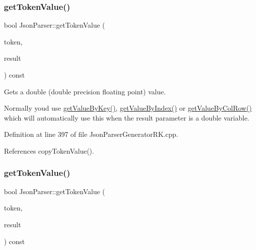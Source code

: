 \mbox{\label{class_json_parser_af378b1400c3f091ae6ba67dc588ca863}} 
\subsubsection{\texorpdfstring{get\+Token\+Value()}{getTokenValue()}\hspace{0.1cm}{\footnotesize\ttfamily [5/8]}}
{\footnotesize\ttfamily bool Json\+Parser\+::get\+Token\+Value (\begin{DoxyParamCaption}\item[{const \hyperlink{struct_json_parser_generator_r_k_1_1jsmntok__t}{Json\+Parser\+Generator\+R\+K\+::jsmntok\+\_\+t} $\ast$}]{token,  }\item[{double \&}]{result }\end{DoxyParamCaption}) const}



Gets a double (double precision floating point) value. 

Normally you\textquotesingle{}d use \hyperlink{class_json_parser_a13abcdcb2341f65ac358bb4d81007d06}{get\+Value\+By\+Key()}, \hyperlink{class_json_parser_a53bd8a6ebb0d9b246b876653e792368f}{get\+Value\+By\+Index()} or \hyperlink{class_json_parser_af1f4a3a65b5cc9cd19b129c410aa78e0}{get\+Value\+By\+Col\+Row()} which will automatically use this when the result parameter is a double variable. 

Definition at line 397 of file Json\+Parser\+Generator\+R\+K.\+cpp.



References copy\+Token\+Value().

\mbox{\label{class_json_parser_a44cff567586e80ba63d39324e5929672}} 
\subsubsection{\texorpdfstring{get\+Token\+Value()}{getTokenValue()}\hspace{0.1cm}{\footnotesize\ttfamily [6/8]}}
{\footnotesize\ttfamily bool Json\+Parser\+::get\+Token\+Value (\begin{DoxyParamCaption}\item[{const \hyperlink{struct_json_parser_generator_r_k_1_1jsmntok__t}{Json\+Parser\+Generator\+R\+K\+::jsmntok\+\_\+t} $\ast$}]{token,  }\item[{\hyperlink{class_string}{String} \&}]{result }\end{DoxyParamCaption}) const}




